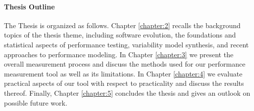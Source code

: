 \paragraph*{Thesis Outline}
The Thesis is organized as follows. Chapter \ref{chapter:2} recalls the background
topics of the thesis theme, including software evolution, the foundations and statistical
aspects of performance testing, variability model synthesis, and recent
approaches to performance modeling. In Chapter \ref{chapter:3} we present the
overall measurement process and discuss the methods used for our performance
measurement tool as well as its limitations. In Chapter \ref{chapter:4} we evaluate practical
aspects of our tool with respect to practicality and discuss the results
thereof. Finally, Chapter \ref{chapter:5} concludes the thesis and gives an
outlook on possible future work.
